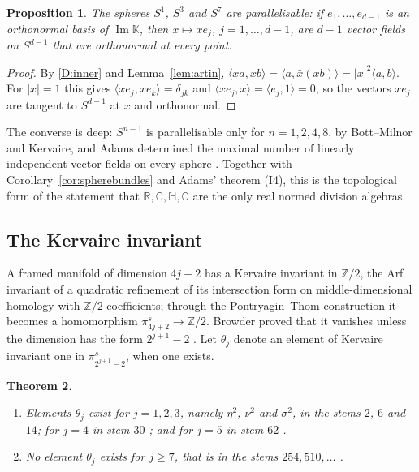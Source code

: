 \documentclass[11pt]{amsart}
\numberwithin{equation}{section}
\theoremstyle{plain}
\newtheorem{theorem}{Theorem}[section]
\newtheorem{proposition}[theorem]{Proposition}
\theoremstyle{definition}
\theoremstyle{remark}
\newcommand{\R}{\mathbb{R}}
\newcommand{\C}{\mathbb{C}}
\newcommand{\Hq}{\mathbb{H}}
\newcommand{\Oc}{\mathbb{O}}
\newcommand{\K}{\mathbb{K}}
\newcommand{\Z}{\mathbb{Z}}
\newcommand{\Imag}{\operatorname{Im}}
\begin{document}
\begin{proposition}\label{prop:parallelisable}
The spheres $S^1$, $S^3$ and $S^7$ are parallelisable: if $e_1,\dots,e_{d-1}$ is an orthonormal basis of $\Imag\K$, then $x\mapsto xe_j$, $j=1,\dots,d-1$, are $d-1$ vector fields on $S^{d-1}$ that are orthonormal at every point.
\end{proposition}

\begin{proof}
By \ref{D:inner} and Lemma~\ref{lem:artin}, $\langle xa,xb\rangle=\langle a,\bar x(xb)\rangle=|x|^2\langle a,b\rangle$. For $|x|=1$ this gives $\langle xe_j,xe_k\rangle=\delta_{jk}$ and $\langle xe_j,x\rangle=\langle e_j,1\rangle=0$, so the vectors $xe_j$ are tangent to $S^{d-1}$ at $x$ and orthonormal.
\end{proof}

The converse is deep: $S^{n-1}$ is parallelisable only for $n=1,2,4,8$, by Bott--Milnor \cite{BM58} and Kervaire, and Adams determined the maximal number of linearly independent vector fields on every sphere \cite{Ada62}. Together with Corollary~\ref{cor:spherebundles} and Adams' theorem (I4), this is the topological form of the statement that $\R,\C,\Hq,\Oc$ are the only real normed division algebras.

\subsection{The Kervaire invariant}\label{sec:kervaire}

A framed manifold of dimension $4j+2$ has a Kervaire invariant in $\Z/2$, the Arf invariant of a quadratic refinement of its intersection form on middle-dimensional homology with $\Z/2$ coefficients; through the Pontryagin--Thom construction it becomes a homomorphism $\pi_{4j+2}^s\to\Z/2$. Browder proved that it vanishes unless the dimension has the form $2^{j+1}-2$ \cite{Bro69}. Let $\theta_j$ denote an element of Kervaire invariant one in $\pi_{2^{j+1}-2}^s$, when one exists.

\begin{theorem}\label{thm:kervaire}
\begin{enumerate}[label=\textup{(\roman*)}]
\item Elements $\theta_j$ exist for $j=1,2,3$, namely $\eta^2$, $\nu^2$ and $\sigma^2$, in the stems $2$, $6$ and $14$; for $j=4$ in stem $30$ \cite{BMT70}; and for $j=5$ in stem $62$ \cite{BJM84}.
\item No element $\theta_j$ exists for $j\ge7$, that is in the stems $254,510,\dots$ \cite{HHR16}.
\end{enumerate}
\end{theorem}
\end{document}
